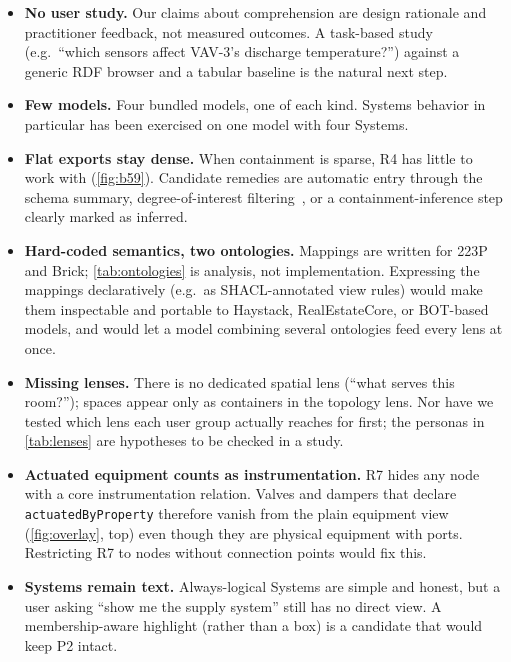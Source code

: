 \documentclass[10pt,twocolumn]{article}
\newcommand{\pred}[1]{\texttt{#1}}   %
\begin{document}
\begin{itemize}[leftmargin=*,itemsep=1pt]
  \item \textbf{No user study.} Our claims about comprehension are design
  rationale and practitioner feedback, not measured outcomes. A task-based
  study (e.g.\ ``which sensors affect VAV-3's discharge temperature?'') against a
  generic RDF browser and a tabular baseline is the natural next step.
  \item \textbf{Few models.} Four bundled models, one of each kind. Systems
  behavior in particular has been exercised on one model with four Systems.
  \item \textbf{Flat exports stay dense.} When containment is sparse, R4 has
  little to work with (\cref{fig:b59}). Candidate remedies are automatic entry
  through the schema summary, degree-of-interest filtering~\cite{vanham2009search},
  or a containment-inference step clearly marked as inferred.
  \item \textbf{Hard-coded semantics, two ontologies.} Mappings are written for
  223P and Brick; \cref{tab:ontologies} is analysis, not implementation. Expressing
  the mappings declaratively (e.g.\ as SHACL-annotated view rules) would make them
  inspectable and portable to Haystack, RealEstateCore, or BOT-based models, and
  would let a model combining several ontologies feed every lens at once.
  \item \textbf{Missing lenses.} There is no dedicated spatial lens (``what serves
  this room?''); spaces appear only as containers in the topology lens. Nor have we
  tested which lens each user group actually reaches for first; the personas in
  \cref{tab:lenses} are hypotheses to be checked in a study.
  \item \textbf{Actuated equipment counts as instrumentation.} R7 hides any node
  with a core instrumentation relation. Valves and dampers that declare
  \pred{actuatedByProperty} therefore vanish from the plain equipment view
  (\cref{fig:overlay}, top) even though they are physical equipment with ports.
  Restricting R7 to nodes without connection points would fix this.
  \item \textbf{Systems remain text.} Always-logical Systems are simple and
  honest, but a user asking ``show me the supply system'' still has no direct
  view. A membership-aware highlight (rather than a box) is a candidate that
  would keep P2 intact.
\end{itemize}

\end{document}
